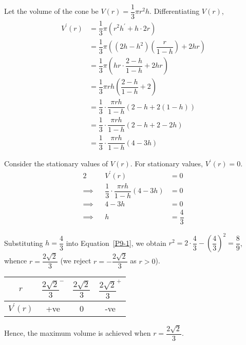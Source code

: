 \documentclass{echw}
\begin{document}
            Let the volume of the cone be $V(r) = \dfrac13 \pi r^2 h$. Differentiating $V(r)$,
            \begin{align*}
                V^\prime(r) &= \dfrac13 \pi (r^2 h^\prime + h \cdot 2r)\\
                &= \dfrac13 \pi \left(\left(2h - h^2\right)\left(\dfrac{r}{1-h}\right) + 2hr\right)\\
                &= \dfrac13 \pi \left(hr\cdot\dfrac{2 - h}{1-h} + 2hr\right)\\
                &= \dfrac13 \pi rh \left(\dfrac{2 - h}{1-h} + 2\right)\\
                &= \dfrac13 \cdot \dfrac{\pi rh}{1-h}(2 - h + 2(1-h))\\
                &= \dfrac13 \cdot \dfrac{\pi rh}{1-h}(2 - h + 2-2h)\\
                &= \dfrac13 \cdot \dfrac{\pi rh}{1-h}(4-3h)
            \end{align*}

            Consider the stationary values of $V(r)$. For stationary values, $V^\prime(r) = 0$.
            \begin{alignat*}{2}
                &&V^\prime(r) &= 0\\
                \implies&& \dfrac13 \cdot \dfrac{\pi rh}{1-h}(4-3h) &= 0\\
                \implies&& 4-3h &= 0\\
                \implies&& h &= \dfrac43
            \end{alignat*}

            Substituting $h = \dfrac43$ into Equation~\ref{P9-1}, we obtain $r^2 = 2\cdot\dfrac43 - \left(\dfrac43\right)^2  = \dfrac89$, whence $r = \dfrac{2\sqrt2}3$ (we reject $r = -\dfrac{2\sqrt2}3$ as $r > 0$).

            \begin{table}[h]
                \centering
                \begin{tabular}{|c|c|c|c|}
                \hline
                $r$ & $\dfrac{2\sqrt2}3^-$ & $\dfrac{2\sqrt2}3$ & $\dfrac{2\sqrt2}3^+$ \\[1ex]\hline
                $V^\prime(r)$ & +ve   & 0 & -ve   \\\hline
                \end{tabular}
            \end{table}

            Hence, the maximum volume is achieved when $r =\dfrac{2\sqrt2}3$. 
\end{document}
